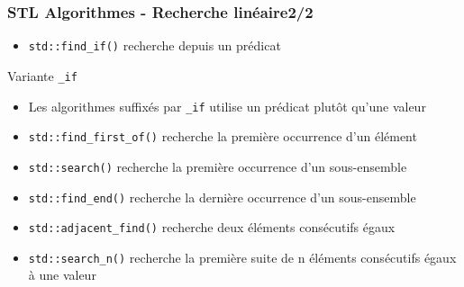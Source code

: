 \documentclass[C++.tex]{subfiles}
\begin{document}
\begin{frame}[fragile]
	\frametitle{STL Algorithmes - Recherche linéaire\titlehfill{}2/2}
	\begin{itemize}
		\item \lstinline|std::find_if()| recherche depuis un prédicat
	\end{itemize}

	\begin{block}{Variante \og \lstinline|_if|\fg{}}
		\begin{itemize}
			\item Les algorithmes suffixés par \lstinline|_if| utilise un prédicat plutôt qu'une valeur
		\end{itemize}
	\end{block}

	\begin{itemize}
		\item \lstinline|std::find_first_of()| recherche la première occurrence d'un élément
		\item \lstinline|std::search()| recherche la première occurrence d'un sous-ensemble
		\item \lstinline|std::find_end()| recherche la dernière occurrence d'un sous-ensemble
		\item \lstinline|std::adjacent_find()| recherche deux éléments consécutifs égaux
		\item \lstinline|std::search_n()| recherche la première suite de n éléments consécutifs égaux à une valeur

	\end{itemize}
\end{frame}
\end{document}

